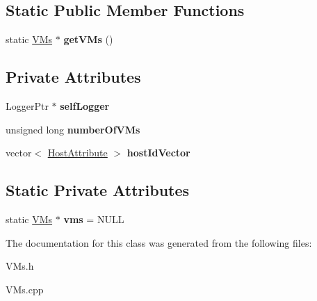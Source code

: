 \subsection*{\-Static \-Public \-Member \-Functions}
\begin{DoxyCompactItemize}
\item 
\hypertarget{classVMs_a5de3d5147663cbc717058b60a7749cc0}{static \hyperlink{classVMs}{\-V\-Ms} $\ast$ {\bfseries get\-V\-Ms} ()}\label{classVMs_a5de3d5147663cbc717058b60a7749cc0}

\end{DoxyCompactItemize}
\subsection*{\-Private \-Attributes}
\begin{DoxyCompactItemize}
\item 
\hypertarget{classVMs_a4c3e7d5bc2f8de88accdd9f8f9ed5468}{\-Logger\-Ptr $\ast$ {\bfseries self\-Logger}}\label{classVMs_a4c3e7d5bc2f8de88accdd9f8f9ed5468}

\item 
\hypertarget{classVMs_a2f9d27d098b4e5b0d80b6f6dc59a54b1}{unsigned long {\bfseries number\-Of\-V\-Ms}}\label{classVMs_a2f9d27d098b4e5b0d80b6f6dc59a54b1}

\item 
\hypertarget{classVMs_af9e0ab653c5444ba1dc9365e94705621}{vector$<$ \hyperlink{structVMs_1_1HostAttribute}{\-Host\-Attribute} $>$ {\bfseries host\-Id\-Vector}}\label{classVMs_af9e0ab653c5444ba1dc9365e94705621}

\end{DoxyCompactItemize}
\subsection*{\-Static \-Private \-Attributes}
\begin{DoxyCompactItemize}
\item 
\hypertarget{classVMs_aba63d0ac7bb9769191c13f4280dd5ae2}{static \hyperlink{classVMs}{\-V\-Ms} $\ast$ {\bfseries vms} = \-N\-U\-L\-L}\label{classVMs_aba63d0ac7bb9769191c13f4280dd5ae2}

\end{DoxyCompactItemize}


\-The documentation for this class was generated from the following files\-:\begin{DoxyCompactItemize}
\item 
\-V\-Ms.\-h\item 
\-V\-Ms.\-cpp\end{DoxyCompactItemize}
